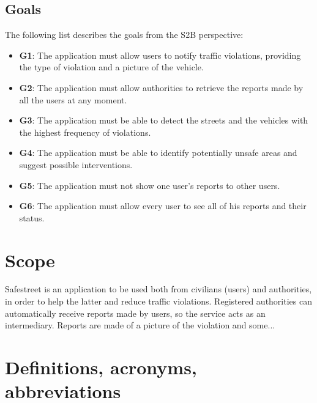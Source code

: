 \documentclass[12pt,a4paper]{report}
\begin{document}
		\subsection{Goals}
The following list describes the goals from the S2B perspective:

\begin{itemize}
	\item \textbf{G1}: The application must allow users to notify traffic violations, providing  the type of violation and a picture of the vehicle.
  	\item \textbf{G2}: The application must allow authorities to retrieve the reports made by all the users at any moment.
	\item \textbf{G3}: The application must be able to detect the streets and the vehicles with the highest frequency of violations.
	\item \textbf{G4}: The application must be able to identify potentially unsafe areas and suggest possible interventions.
	\item \textbf{G5}: The application must not show one user's reports to other users.
	\item \textbf{G6}: The application must allow every user to see all of his reports and their status.
\end{itemize}

	\section{Scope}
Safestreet is an application to be used both from civilians (users) and authorities, in order to help the latter and reduce traffic violations. Registered authorities can automatically receive reports made by users, so the service acts as an intermediary. Reports are made of a picture of the violation and some... 

	\section{Definitions, acronyms, abbreviations}
\end{document}
